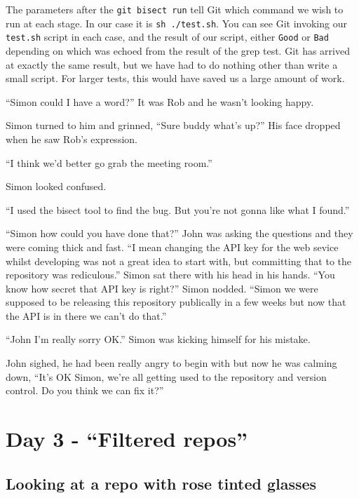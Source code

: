 The parameters after the \texttt{git bisect run} tell Git which command we wish to run at each stage.
In our case it is \texttt{sh ./test.sh}.
You can see Git invoking our \texttt{test.sh} script in each case, and the result of our script, either \texttt{Good} or \texttt{Bad} depending on which was echoed from the result of the grep test.
Git has arrived at exactly the same result, but we have had to do nothing other than write a small script.
For larger tests, this would have saved us a large amount of work.

\begin{trenches}
``Simon could I have a word?'' It was Rob and he wasn't looking happy.

Simon turned to him and grinned, ``Sure buddy what's up?''  His face dropped when he saw Rob's expression.

``I think we'd better go grab the meeting room.''

Simon looked confused.

``I used the bisect tool to find the bug.  But you're not gonna like what I found.''

\thoughtbreak

``Simon how could you have done that?'' John was asking the questions and they were coming thick and fast.
``I mean changing the API key for the web sevice whilst developing was not a great idea to start with, but committing that to the repository was rediculous.''
Simon sat there with his head in his hands.
``You know how secret that API key is right?'' Simon nodded.
``Simon we were supposed to be releasing this repository publically in a few weeks but now that the API is in there we can't do that.''

``John I'm really sorry OK.'' Simon was kicking himself for his mistake.

John sighed, he had been really angry to begin with but now he was calming down,
``It's OK Simon, we're all getting used to the repository and version control.  Do you think we can fix it?''
\end{trenches}

\section{Day 3 - ``Filtered repos''}
\subsection{Looking at a repo with rose tinted glasses}


